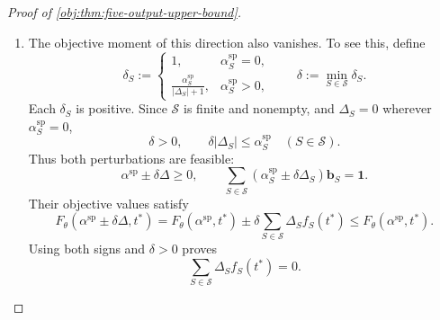 \begin{proof}[Proof of \cref{obj:thm:five-output-upper-bound}]
\begin{enumerate}
Suppose that \(|\mathcal K_{\mathrm{sp}}|>5\).
The more than five columns
\[
\begin{pmatrix}\mathbf b_S\\ \dot f_S(t^*)\end{pmatrix}
\in\mathbb R^5,
\qquad S\in\mathcal K_{\mathrm{sp}},
\]
are linearly dependent. Extending their dependence coefficients by zero
outside \(\mathcal K_{\mathrm{sp}}\) gives
\[
\begin{gathered}
\Delta=(\Delta_S)_{S\in\mathcal S}
\in\mathbb R^{\mathcal S}\setminus\{0\},
\qquad
\Delta_S=0\quad(S\notin\mathcal K_{\mathrm{sp}}),\\
\sum_{S\in\mathcal S}\Delta_S\mathbf b_S=0,
\qquad
\sum_{S\in\mathcal S}\Delta_S\dot f_S(t^*)=0.
\end{gathered}
\]

\item
The objective moment of this direction also vanishes.
To see this, define
\[
\delta_S:=
\begin{cases}
1,&\alpha^{\mathrm{sp}}_S=0,\\
\displaystyle\frac{\alpha^{\mathrm{sp}}_S}{|\Delta_S|+1},
&\alpha^{\mathrm{sp}}_S>0,
\end{cases}
\qquad
\delta:=\min_{S\in\mathcal S}\delta_S.
\]
Each \(\delta_S\) is positive. Since \(\mathcal S\) is finite and
nonempty, and \(\Delta_S=0\) wherever \(\alpha^{\mathrm{sp}}_S=0\),
\[
\delta>0,
\qquad
\delta|\Delta_S|\le\alpha^{\mathrm{sp}}_S
\quad(S\in\mathcal S).
\]
Thus both perturbations are feasible:
\[
\alpha^{\mathrm{sp}}\pm\delta\Delta\ge0,
\qquad
\sum_{S\in\mathcal S}
(\alpha^{\mathrm{sp}}_S\pm\delta\Delta_S)\mathbf b_S
=\mathbf1.
\]
Their objective values satisfy
\[
F_\theta(\alpha^{\mathrm{sp}}\pm\delta\Delta,t^*)
=
F_\theta(\alpha^{\mathrm{sp}},t^*)
\pm\delta\sum_{S\in\mathcal S}\Delta_Sf_S(t^*)
\le F_\theta(\alpha^{\mathrm{sp}},t^*).
\]
Using both signs and \(\delta>0\) proves
\[
\sum_{S\in\mathcal S}\Delta_Sf_S(t^*)=0.
\]


\end{enumerate}
\end{proof}
